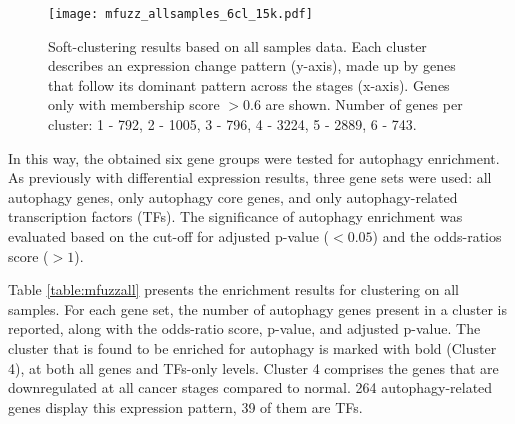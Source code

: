         
            \begin{figure}[!h]
            \centering
            \texttt{[image: mfuzz\_allsamples\_6cl\_15k.pdf]} 
            \caption[Soft-clustering results for all samples gene expression]{Soft-clustering results based on all samples data. Each cluster describes an expression change pattern (y-axis), made up by genes that follow its dominant pattern across the stages (x-axis). Genes only with membership score $>0.6$ are shown. Number of genes per cluster: 1 - 792, 2 - 1005, 3 - 796, 4 - 3224, 5 - 2889, 6 - 743.}
            \label{fig:mfuzzall}
            \end{figure}
            
        In this way, the obtained six gene groups were tested for autophagy enrichment. As previously with differential expression results, three gene sets were used: all autophagy genes, only autophagy core genes, and only autophagy-related transcription factors (TFs). The significance of autophagy enrichment was evaluated based on the cut-off for adjusted p-value ($<0.05$) and the odds-ratios score ($>1$).
        
        Table \ref{table:mfuzzall} presents the enrichment results for clustering on all samples. For each gene set, the number of autophagy genes present in a cluster is reported, along with the odds-ratio score, p-value, and adjusted p-value. The cluster that is found to be enriched for autophagy is marked with bold (Cluster 4), at both all genes and TFs-only levels. Cluster 4 comprises the genes that are downregulated at all cancer stages compared to normal. 264 autophagy-related genes display this expression pattern, 39 of them are TFs.
    

